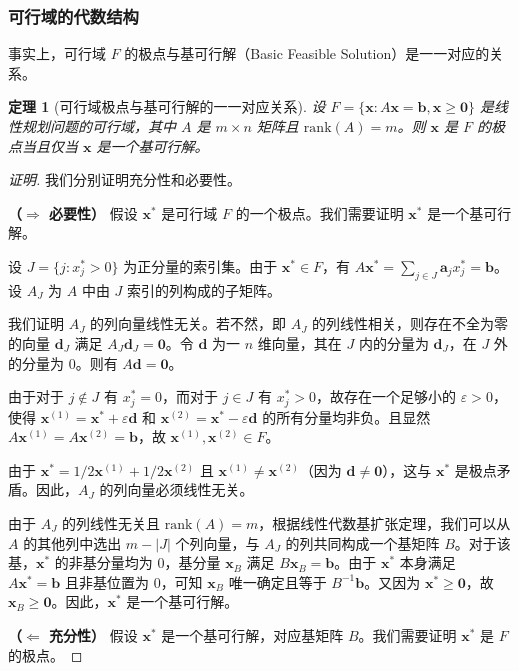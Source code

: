 \documentclass[12pt]{article}
\theoremstyle{plain}
\newtheorem{thm}{定理}[subsection]
\theoremstyle{definition}
\newenvironment{prf}[1][证明]{\begin{proof}[#1]}{\end{proof}}
\newcommand{\rank}{\mathrm{rank}}
\begin{document}
\subsubsection{可行域的代数结构}\label{subsubsec:algebraic_structure}

事实上，可行域 $F$ 的极点与基可行解（Basic Feasible Solution）是一一对应的关系。
\begin{thm}[可行域极点与基可行解的一一对应关系]
    设 $F = \{\bm{x} : A\bm{x} = \bm{b}, \bm{x} \geq \bm{0}\}$ 是线性规划问题的可行域，其中 $A$ 是 $m \times n$ 矩阵且 $\rank(A) = m$。则 $\bm{x}$ 是 $F$ 的极点当且仅当 $\bm{x}$ 是一个基可行解。
\end{thm}
\begin{prf}
    我们分别证明充分性和必要性。

    \textbf{（$\Rightarrow$ 必要性）} 假设 $\bm{x}^*$ 是可行域 $F$ 的一个极点。我们需要证明 $\bm{x}^*$ 是一个基可行解。
    
    设 $J = \{j : x^*_j > 0\}$ 为正分量的索引集。由于 $\bm{x}^* \in F$，有 $A\bm{x}^* = \sum_{j \in J} \bm{a}_j x^*_j = \bm{b}$。设 $A_J$ 为 $A$ 中由 $J$ 索引的列构成的子矩阵。
    
    我们证明 $A_J$ 的列向量线性无关。若不然，即 $A_J$ 的列线性相关，则存在不全为零的向量 $\bm{d}_J$ 满足 $A_J \bm{d}_J = \bm{0}$。令 $\bm{d}$ 为一 $n$ 维向量，其在 $J$ 内的分量为 $\bm{d}_J$，在 $J$ 外的分量为 $0$。则有 $A\bm{d} = \bm{0}$。
    
    由于对于 $j \notin J$ 有 $x^*_j = 0$，而对于 $j \in J$ 有 $x^*_j > 0$，故存在一个足够小的 $\varepsilon > 0$，使得 $\bm{x}^{(1)} = \bm{x}^* + \varepsilon \bm{d}$ 和 $\bm{x}^{(2)} = \bm{x}^* - \varepsilon \bm{d}$ 的所有分量均非负。且显然 $A\bm{x}^{(1)} = A\bm{x}^{(2)} = \bm{b}$，故 $\bm{x}^{(1)}, \bm{x}^{(2)} \in F$。
    
    由于 $\bm{x}^* = 1/2 \bm{x}^{(1)} + 1/2 \bm{x}^{(2)}$ 且 $\bm{x}^{(1)} \neq \bm{x}^{(2)}$（因为 $\bm{d} \neq \bm{0}$），这与 $\bm{x}^*$ 是极点矛盾。因此，$A_J$ 的列向量必须线性无关。
    
    由于 $A_J$ 的列线性无关且 $\rank(A) = m$，根据线性代数基扩张定理，我们可以从 $A$ 的其他列中选出 $m - |J|$ 个列向量，与 $A_J$ 的列共同构成一个基矩阵 $B$。对于该基，$\bm{x}^*$ 的非基分量均为 $0$，基分量 $\bm{x}_B$ 满足 $B\bm{x}_B = \bm{b}$。由于 $\bm{x}^*$ 本身满足 $A\bm{x}^* = \bm{b}$ 且非基位置为 $0$，可知 $\bm{x}_B$ 唯一确定且等于 $B^{-1}\bm{b}$。又因为 $\bm{x}^* \geq \bm{0}$，故 $\bm{x}_B \geq \bm{0}$。因此，$\bm{x}^*$ 是一个基可行解。

    \textbf{（$\Leftarrow$ 充分性）} 假设 $\bm{x}^*$ 是一个基可行解，对应基矩阵 $B$。我们需要证明 $\bm{x}^*$ 是 $F$ 的极点。
    

\end{prf}
\end{document}
